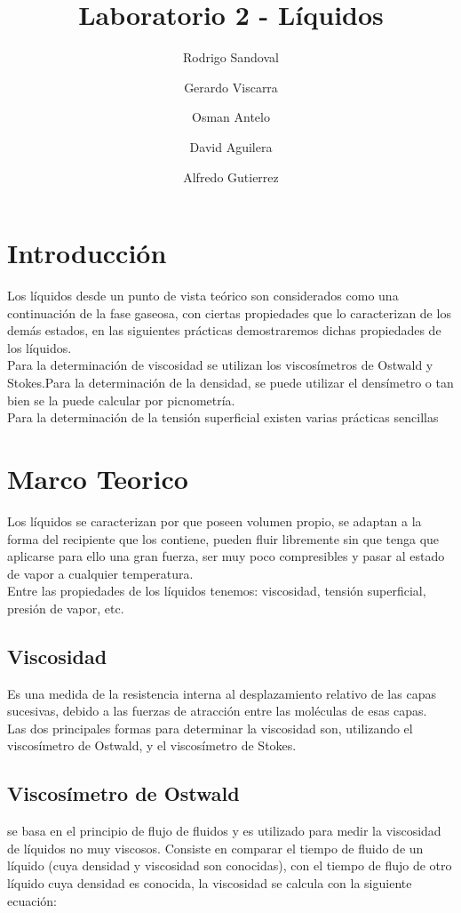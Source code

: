 \documentclass[11pt, letterpaper]{article}
\title{Laboratorio 2 - Líquidos}
\author{
  Rodrigo Sandoval\\
  \and
  Gerardo Viscarra\\
  \and
  Osman Antelo\\
  \and
  David Aguilera\\
  \and
  Alfredo Gutierrez\\
}
\begin{document}
\maketitle
\section{Introducción}
Los líquidos desde un punto de vista teórico son considerados como   una continuación de la fase gaseosa, con ciertas propiedades que lo caracterizan de los demás estados, en las siguientes prácticas demostraremos dichas propiedades de los líquidos.\\

Para la determinación de viscosidad se utilizan los viscosímetros de Ostwald y Stokes.Para la determinación de la densidad, se puede utilizar el densímetro o tan bien se la puede calcular por picnometría.\\

Para la determinación de la tensión superficial existen varias prácticas sencillas
\section{Marco Teorico}
Los líquidos se caracterizan por que poseen volumen propio, se adaptan a la forma del recipiente que los contiene, pueden fluir libremente sin que tenga que aplicarse para ello una gran fuerza, ser muy poco compresibles y pasar al estado de vapor a cualquier temperatura.\\

Entre las propiedades de los líquidos tenemos:  viscosidad, tensión superficial, presión de vapor, etc.
\subsection{Viscosidad}
Es una medida de la resistencia interna al desplazamiento relativo de las capas sucesivas, debido a las fuerzas de atracción entre las  moléculas de esas capas.\\

Las dos principales formas para determinar la viscosidad son,   utilizando el viscosímetro de Ostwald, y el viscosímetro de Stokes.
\subsection{Viscosímetro de Ostwald}
se basa en el principio de flujo de fluidos y es utilizado para  medir  la  viscosidad  de  líquidos  no  muy  viscosos.  Consiste  en  comparar  el tiempo  de  fluido  de  un  líquido  (cuya  densidad  y  viscosidad  son  conocidas),  con  el tiempo de flujo de otro líquido cuya densidad  es conocida, la viscosidad se calcula con la siguiente ecuación:
\end{document}
